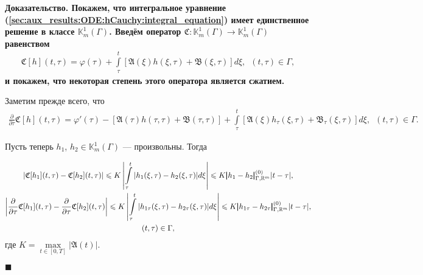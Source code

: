 \documentclass{report}
\newenvironment{Proof}{\par\noindent\bf Доказательство.\rm}{ $\blacksquare$\par}
\begin{document}
\begin{Proof}
Покажем, что интегральное уравнение (\ref{sec:aux_results:ODE:hCauchy:integral_equation}) имеет единственное решение в классе $\mathbb{K}^1_m(\Gamma)$. Введём оператор $\mathfrak{C}\colon
\mathbb{K}^1_m(\Gamma)\to \mathbb{K}^1_m(\Gamma)$ равенством
\begin{gather*}
\mathfrak{C}[h](t,\tau)= \varphi(\tau)+\int\limits_\tau^t[\mathfrak{A}(\xi)h(\xi,\tau)+\mathfrak{B}(\xi,\tau)]d\xi,\,\,\,(t,\tau)\in\Gamma,
\end{gather*}
и покажем, что некоторая степень этого оператора является сжатием.

Заметим прежде всего, что
\begin{gather*}
\frac{\partial}{\partial\tau}\mathfrak{C}[h](t,\tau)=\varphi'(\tau)-[\mathfrak{A}(\tau)h(\tau,\tau)+\mathfrak{B}(\tau,\tau)]+
\int\limits_\tau^t[\mathfrak{A}(\xi)h_\tau(\xi,\tau)+\mathfrak{B}_\tau(\xi,\tau)]d\xi,\,\,\,(t,\tau)\in\Gamma.
\end{gather*}

Пусть теперь $h_1$, $h_2\in \mathbb{K}^1_m(\Gamma)$ --- произвольны. Тогда

\begin{gather}\label{sec:aux_result:ODE:mathfrakC_estimate}
|\mathfrak{C}[h_1](t,\tau)-\mathfrak{C}[h_2](t,\tau)|\leqslant K\left|\int\limits_\tau^t|h_1(\xi,\tau)-h_2(\xi,\tau)|d\xi\right|\leqslant K\pmb{|}h_1-h_2\pmb{|}^{(0)}_{\Gamma,\mathbb{R}^m}
|t-\tau|,\\
\notag \left|\frac{\partial}{\partial\tau}\mathfrak{C}[h_1](t,\tau)-\frac{\partial}{\partial\tau}\mathfrak{C}[h_2](t,\tau)\right|\leqslant K\left|\int\limits_\tau^t
|h_{1\tau}(\xi,\tau)-h_{2\tau}(\xi,\tau)|d\xi\right|\leqslant K\pmb{|}h_{1\tau}-h_{2\tau}\pmb{|}^{(0)}_{\Gamma,\mathbb{R}^m}|t-\tau|,\\
\notag (t,\tau)\in\Gamma,
\end{gather}
где $K=\max\limits_{t\in[0,T]}|\mathfrak{A}(t)|$.


\end{Proof}
\end{document}
